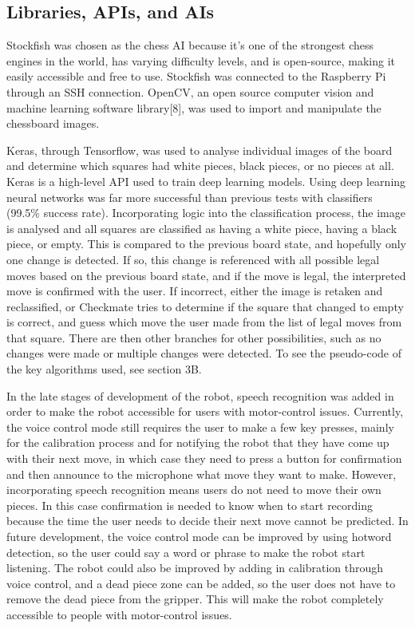 \documentclass[onecolumn]{IEEEtran}
\begin{document}
\subsection{Libraries, APIs, and AIs}
Stockfish was chosen as the chess AI because it's one of the strongest chess engines in the world, has varying difficulty levels, and is open-source, making it easily accessible and free to use. Stockfish was connected to the Raspberry Pi through an SSH connection. OpenCV, an open source computer vision and machine learning software library[8], was used to import and manipulate the chessboard images. \par 
Keras, through Tensorflow, was used to analyse individual images of the board and determine which squares had white pieces, black pieces, or no pieces at all. Keras is a high-level API used to train deep learning models. Using deep learning neural networks was far more successful than previous tests with classifiers (99.5\% success rate). Incorporating logic into the classification process, the image is analysed and all squares are classified as having a white piece, having a black piece, or empty. This is compared to the previous board state, and hopefully only one change is detected. If so, this change is referenced with all possible legal moves based on the previous board state, and if the move is legal, the interpreted move is confirmed with the user. If incorrect, either the image is retaken and reclassified, or Checkmate tries to determine if the square that changed to empty is correct, and guess which move the user made from the list of legal moves from that square. There are then other branches for other possibilities, such as no changes were made or multiple changes were detected. To see the pseudo-code of the key algorithms used, see section 3B. \par
In the late stages of development of the robot, speech recognition was added in order to make the robot accessible for users with motor-control issues. Currently, the voice control mode still requires the user to make a few key presses, mainly for the calibration process and for notifying the robot that they have come up with their next move, in which case they need to press a button for confirmation and then announce to the microphone what move they want to make. However, incorporating speech recognition means users do not need to move their own pieces. In this case confirmation is needed to know when to start recording because the time the user needs to decide their next move cannot be predicted. In future development, the voice control mode can be improved by using hotword detection, so the user could say a word or phrase to make the robot start listening. The robot could also be improved by adding in calibration through voice control, and a dead piece zone can be added, so the user does not have to remove the dead piece from the gripper. This will make the robot completely accessible to people with motor-control issues.\par
\end{document}
